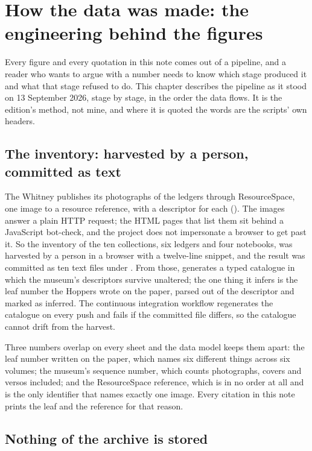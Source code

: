 \chapter{How the data was made: the engineering behind the figures}

Every figure and every quotation in this note comes out of a pipeline, and a reader who wants to argue with a number needs to know which stage produced it and what that stage refused to do. This chapter describes the pipeline as it stood on 13 September 2026, stage by stage, in the order the data flows. It is the edition's method, not mine, and where it is quoted the words are the scripts' own headers.

\section{The inventory: harvested by a person, committed as text}

The Whitney publishes its photographs of the ledgers through ResourceSpace, one image to a resource reference, with a descriptor for each (). The images answer a plain HTTP request; the HTML pages that list them sit behind a JavaScript bot-check, and the project does not impersonate a browser to get past it. So the inventory of the ten collections, six ledgers and four notebooks, was harvested by a person in a browser with a twelve-line snippet, and the result was committed as ten text files under . From those,  generates a typed catalogue in which the museum's descriptors survive unaltered; the one thing it infers is the leaf number the Hoppers wrote on the paper, parsed out of the descriptor and marked as inferred. The continuous integration workflow regenerates the catalogue on every push and fails if the committed file differs, so the catalogue cannot drift from the harvest.

Three numbers overlap on every sheet and the data model keeps them apart: the leaf number written on the paper, which names six different things across six volumes; the museum's sequence number, which counts photographs, covers and versos included; and the ResourceSpace reference, which is in no order at all and is the only identifier that names exactly one image. Every citation in this note prints the leaf and the reference for that reason.

\section{Nothing of the archive is stored}

